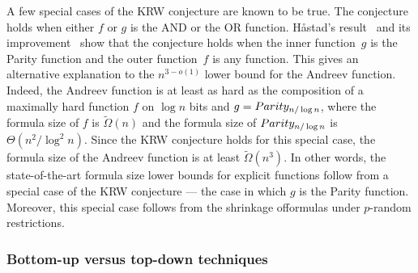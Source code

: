 \documentclass[11pt]{article}
\numberwithin{equation}{section}
\theoremstyle{definition}
\theoremstyle{plain}
\theoremstyle{definition}\newtheorem{notation}[theorem]{Notation}\theoremstyle{plain}
\newcommand{\parity}{\textup{\textsf{Parity}}}
\theoremstyle{definition}
\theoremstyle{plain}
\begin{document}
A few special cases of the KRW conjecture are known to be true. The
conjecture holds when either $f$ or $g$ is the AND or the OR function.
H{\aa}stad's result~\cite{H98} and its improvement~\cite{T14}
show that the conjecture holds when the inner function~$g$ is the
Parity function and the outer function~$f$ is any function. This
gives an alternative explanation to the $n^{3-o(1)}$ lower bound
for the Andreev function. Indeed, the Andreev function is at least
as hard as the composition of a maximally hard function $f$ on $\log n$
bits and $g=\parity_{n/\log n}$, where the formula size of $f$ is
$\tilde{\Omega}(n)$ and the formula size of $\parity_{n/\log n}$
is $\Theta(n^{2}/\log^{2}n)$. Since the KRW conjecture holds for
this special case, the formula size of the Andreev function is at
least $\tilde{\Omega}(n^{3})$. In other words, the state-of-the-art
formula size lower bounds for explicit functions follow from a special
case of the KRW conjecture --- the case in which $g$ is the Parity
function. Moreover, this special case follows from the shrinkage offormulas under $p$-random restrictions.

%
\subsubsection{Bottom-up versus top-down techniques}
%
\end{document}
